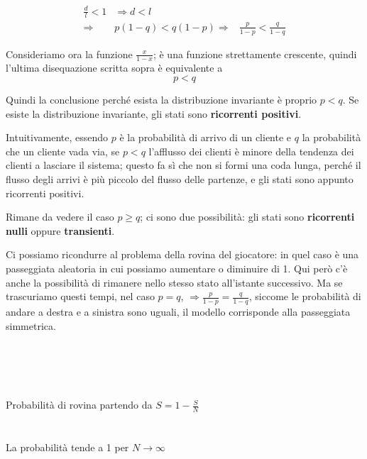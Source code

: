 \documentclass[a4paper,12pt]{book}
\begin{document}
\begin{align}
	\frac{d}{l} < 1 & \Rightarrow d < l \\
	\Rightarrow & p(1-q) < q(1-p)
	\Rightarrow &	\frac{p}{1-p} < \frac{q}{1-q} %
\end{align}

Consideriamo ora la funzione $ \frac{x}{1-x} $; è una funzione strettamente crescente, quindi l'ultima disequazione scritta sopra è equivalente a
$$ p < q $$

Quindi la conclusione perché esista la distribuzione invariante è proprio $ p < q $. Se esiste la distribuzione invariante, gli stati sono \textbf{ricorrenti positivi}. 


Intuitivamente, essendo $ p $ è la probabilità di arrivo di un cliente e $ q $ la probabilità che un cliente vada via, se $ p < q $ l'afflusso dei clienti è minore della tendenza dei clienti a lasciare il sistema; questo fa sì che non si formi una coda lunga, perché il flusso degli arrivi è più piccolo del flusso delle partenze, e gli stati sono appunto ricorrenti positivi. 

Rimane da vedere il caso $ p \ge q $; ci sono due possibilità: gli stati sono \textbf{ricorrenti nulli} oppure \textbf{transienti}. 

Ci possiamo ricondurre al problema della rovina del giocatore: in quel caso è una passeggiata aleatoria in cui possiamo aumentare o diminuire di 1. Qui però c'è anche la possibilità di rimanere nello stesso stato all'istante successivo. Ma se trascuriamo questi tempi, nel caso $ p = q $, $ \Rightarrow \frac{p}{1-p} = \frac{q}{1-q} $, siccome le probabilità di andare a destra e a sinistra sono uguali, il modello corrisponde alla passeggiata simmetrica. 
\\
\\
\\
\begin{multicols}{2}
	\\
	\\
	Probabilità di rovina partendo da $S = 1- \frac{S}{N} $\\ 
	\\
	\\
	La probabilità tende a 1 per $ N \to \infty $
\end{multicols}
\end{document}

